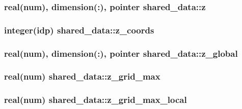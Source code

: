 \subsubsection[{\texorpdfstring{z}{z}}]{\setlength{\rightskip}{0pt plus 5cm}real(num), dimension(\+:), pointer shared\+\_\+data\+::z}\hypertarget{namespaceshared__data_a2094b23a08f2ff99add0a52c71d13b04}{}\label{namespaceshared__data_a2094b23a08f2ff99add0a52c71d13b04}
\subsubsection[{\texorpdfstring{z\+\_\+coords}{z_coords}}]{\setlength{\rightskip}{0pt plus 5cm}integer(idp) shared\+\_\+data\+::z\+\_\+coords}\hypertarget{namespaceshared__data_a208c54ff19ecd9211442644004e44a79}{}\label{namespaceshared__data_a208c54ff19ecd9211442644004e44a79}
\subsubsection[{\texorpdfstring{z\+\_\+global}{z_global}}]{\setlength{\rightskip}{0pt plus 5cm}real(num), dimension(\+:), pointer shared\+\_\+data\+::z\+\_\+global}\hypertarget{namespaceshared__data_a560ccdd90913c790de3698e6caa6ed8b}{}\label{namespaceshared__data_a560ccdd90913c790de3698e6caa6ed8b}
\subsubsection[{\texorpdfstring{z\+\_\+grid\+\_\+max}{z_grid_max}}]{\setlength{\rightskip}{0pt plus 5cm}real(num) shared\+\_\+data\+::z\+\_\+grid\+\_\+max}\hypertarget{namespaceshared__data_a620f1c71c4db6b0f2b9f0acc6aefa10d}{}\label{namespaceshared__data_a620f1c71c4db6b0f2b9f0acc6aefa10d}
\subsubsection[{\texorpdfstring{z\+\_\+grid\+\_\+max\+\_\+local}{z_grid_max_local}}]{\setlength{\rightskip}{0pt plus 5cm}real(num) shared\+\_\+data\+::z\+\_\+grid\+\_\+max\+\_\+local}\hypertarget{namespaceshared__data_a456c52690b2fd4549464d70435bb3181}{}\label{namespaceshared__data_a456c52690b2fd4549464d70435bb3181}
